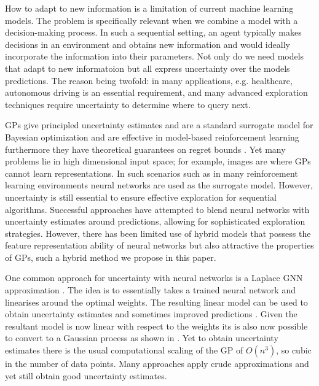 \documentclass{article}
\begin{document}
How to adapt to new information is a limitation of current machine learning models. The problem is specifically relevant when we combine a model with a decision-making process. In such a sequential setting, an agent typically makes decisions in an environment and obtains new information and would ideally incorporate the information into their parameters. Not only do we need models that adapt to new informatoion but all express uncertainty over the models predictions. The reason being twofold: in many applications, e.g. healthcare, autonomous driving is an essential requirement, and many advanced exploration techniques require uncertainty to determine where to query next.

GPs give principled uncertainty estimates and are a standard surrogate model for Bayesian optimization \citep{garnett_bayesoptbook_2022} and are effective in model-based reinforcement learning \citep{deisenroth2011pilco} furthermore they have theoretical guarantees on regret bounds \citep{srinivas2009gaussian}. Yet many problems lie in high dimensional input space; for example, images are where GPs cannot learn representations. In such scenarios such as in many reinforcement learning environments neural networks are used as the surrogate model. However, uncertainty is still essential to ensure effective exploration for sequential algorithms. Successful approaches have attempted to blend neural networks with uncertainty estimates around predictions, allowing for sophisticated exploration strategies. However, there has been limited use of hybrid models that possess the feature representation ability of neural networks but also attractive the properties of GPs, such a hybrid method we propose in this paper.

One common approach for uncertainty with neural networks is a Laplace GNN approximation \citep{daxbergerLaplace2021}. The idea is to essentially takes a trained neural network and linearises around the optimal weights. The resulting linear model can be used to obtain uncertainty estimates and sometimes improved predictions \citep{immerScalable2021}. Given the resultant model is now linear with respect to the weights its is also now possible to convert to a Gaussian process as shown in \citep{immerScalable2021, khan2019approximate}. Yet to obtain uncertainty estimates there is the usual computational scaling of the GP of $O(n^3)$, so cubic in the number of data points. Many approaches  apply crude approximations and yet still obtain good uncertainty estimates. 
\end{document}
